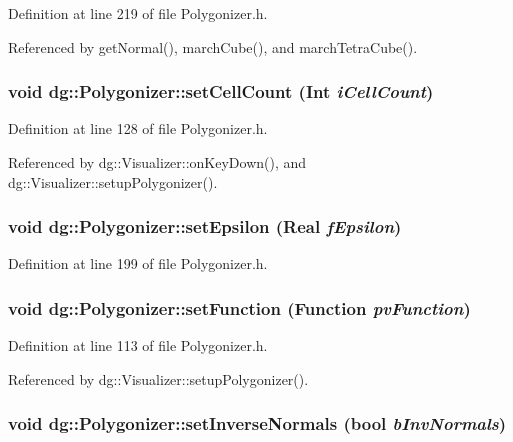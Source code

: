 Definition at line 219 of file Polygonizer.h.

Referenced by get\-Normal(), march\-Cube(), and march\-Tetra\-Cube().
\subsubsection{\setlength{\rightskip}{0pt plus 5cm}void dg::Polygonizer::set\-Cell\-Count ({\bf Int} {\em i\-Cell\-Count})\hspace{0.3cm}{\tt  [inline]}}\label{classdg_1_1Polygonizer_a5}




Definition at line 128 of file Polygonizer.h.

Referenced by dg::Visualizer::on\-Key\-Down(), and dg::Visualizer::setup\-Polygonizer().
\subsubsection{\setlength{\rightskip}{0pt plus 5cm}void dg::Polygonizer::set\-Epsilon ({\bf Real} {\em f\-Epsilon})\hspace{0.3cm}{\tt  [inline]}}\label{classdg_1_1Polygonizer_a13}




Definition at line 199 of file Polygonizer.h.
\subsubsection{\setlength{\rightskip}{0pt plus 5cm}void dg::Polygonizer::set\-Function ({\bf Function} {\em pv\-Function})\hspace{0.3cm}{\tt  [inline]}}\label{classdg_1_1Polygonizer_a2}




Definition at line 113 of file Polygonizer.h.

Referenced by dg::Visualizer::setup\-Polygonizer().
\subsubsection{\setlength{\rightskip}{0pt plus 5cm}void dg::Polygonizer::set\-Inverse\-Normals (bool {\em b\-Inv\-Normals})\hspace{0.3cm}{\tt  [inline]}}\label{classdg_1_1Polygonizer_a3}




